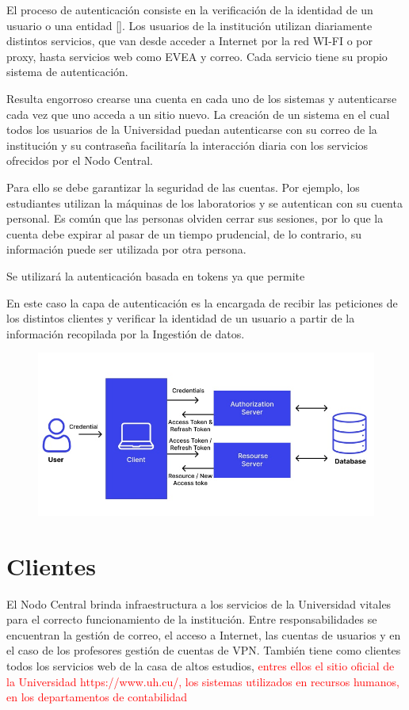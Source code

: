 El proceso de autenticación consiste en la verificación de la identidad de un usuario o una entidad  [\cite{teheran2014mecanismo}]. Los usuarios de la institución utilizan diariamente distintos servicios, que van desde acceder a Internet por la red WI-FI o por proxy, hasta servicios web como EVEA y correo. Cada servicio tiene su propio sistema de autenticación.

Resulta engorroso crearse una cuenta en cada uno de los sistemas y autenticarse cada vez que uno acceda a un sitio nuevo. La creación de un sistema en el cual todos los usuarios de la Universidad puedan autenticarse con su correo de la institución y su contraseña facilitaría la interacción diaria con los servicios ofrecidos por el Nodo Central.

Para ello se debe garantizar la seguridad de las cuentas. Por ejemplo, los estudiantes utilizan la máquinas de los laboratorios y se autentican con su cuenta personal. Es común que las personas olviden cerrar sus sesiones, por lo que la cuenta debe expirar al pasar de un tiempo prudencial, de lo contrario, su información puede ser utilizada por otra persona.



Se utilizará la autenticación basada en tokens ya que permite 

En este caso la capa de autenticación es la encargada de recibir las peticiones de los distintos clientes y verificar la identidad de un usuario a partir de la información recopilada por la Ingestión de datos.

\begin{figure}[H]
	\centering
	\includegraphics[width=0.9\linewidth]{Graphics/token-based-auth}
	\caption{}
	\label{fig:token-based-auth}
\end{figure}



\section*{Clientes}
El Nodo Central brinda infraestructura a los servicios de la Universidad vitales para el correcto funcionamiento de la institución. Entre responsabilidades se encuentran la gestión de correo, el acceso a Internet, las cuentas de usuarios y en el caso de los profesores gestión de cuentas de VPN. También tiene como clientes todos los servicios web de la casa de altos estudios, \textcolor{red}{entres ellos el sitio oficial de la Universidad https://www.uh.cu/, los sistemas utilizados en recursos humanos, en los departamentos de contabilidad}

